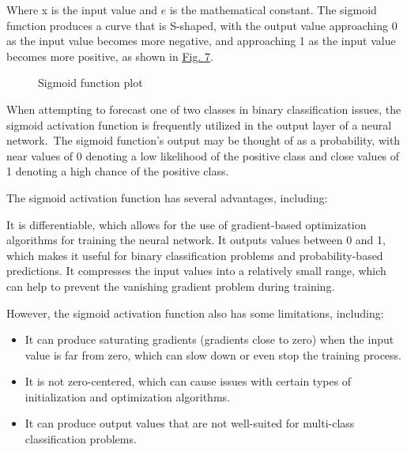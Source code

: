 \documentclass[a4paper]{article}
\begin{document}
Where x is the input value and $e$ is the mathematical constant. The sigmoid function produces a curve that is S-shaped, with the output value approaching 0 as the input value becomes more negative, and approaching 1 as the input value becomes more positive, as shown in \hyperref[fig:sigmoid]{Fig. 7}.

\begin{center}
\begin{figure}[!h]
\centering
{}
\caption{Sigmoid function plot}
\label{fig:sigmoid}
\end{figure}
\end{center}

When attempting to forecast one of two classes in binary classification issues, the sigmoid activation function is frequently utilized in the output layer of a neural network. The sigmoid function's output may be thought of as a probability, with near values of 0 denoting a low likelihood of the positive class and close values of 1 denoting a high chance of the positive class.

The sigmoid activation function has several advantages, including:

It is differentiable, which allows for the use of gradient-based optimization algorithms for training the neural network.
It outputs values between 0 and 1, which makes it useful for binary classification problems and probability-based predictions.
It compresses the input values into a relatively small range, which can help to prevent the vanishing gradient problem during training.

However, the sigmoid activation function also has some limitations, including:

\begin{itemize}[leftmargin=7.5pt]
    \item It can produce saturating gradients (gradients close to zero) when the input value is far from zero, which can slow down or even stop the training process.
    \item It is not zero-centered, which can cause issues with certain types of initialization and optimization algorithms.
    \item It can produce output values that are not well-suited for multi-class classification problems.
\end{itemize}
\end{document}
